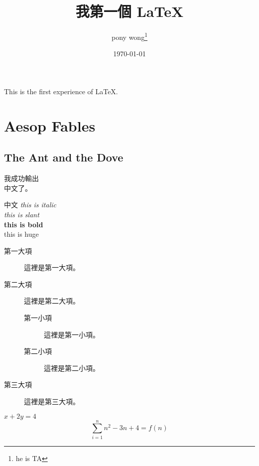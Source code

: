 \documentclass[12pt, a4paper, twocolumn]{report}
\author{pony wong\footnote{he is TA}}
\title{我第一個 LaTeX}
\date{\today}
\begin{document}
\maketitle
This is the first experience of \LaTeX.
\chapter{Aesop Fables}
\section{The Ant and the Dove}
我成功輸出\\[1cm]中文了。

中文
{\it this is italic}\\
{\sl this is slant}\\
{\bf this is bold}\\
{\huge this is huge}\\

\begin{description}
\item[第一大項]這裡是第一大項。
\item[第二大項]這裡是第二大項。
\begin{description}
\item[第一小項]這裡是第一小項。
\item[第二小項]這裡是第二小項。
\end{description} 
\item[第三大項]這裡是第三大項。
\end{description}

$x + 2y = 4$\\
\[\sum_{i=1}^{n}{n^2-3n+4} = f(n)\]
\end{document}
